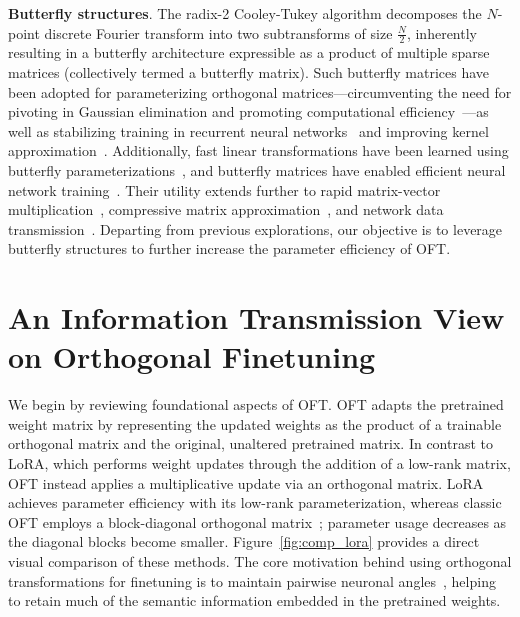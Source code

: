 \textbf{Butterfly structures}. The radix-2 Cooley-Tukey algorithm decomposes the $N$-point discrete Fourier transform into two subtransforms of size $\frac{N}{2}$, inherently resulting in a butterfly architecture expressible as a product of multiple sparse matrices (collectively termed a butterfly matrix). Such butterfly matrices have been adopted for parameterizing orthogonal matrices—circumventing the need for pivoting in Gaussian elimination and promoting computational efficiency~\cite{parker1995random}—as well as stabilizing training in recurrent neural networks~\cite{jing2017tunable} and improving kernel approximation~\cite{munkhoeva2018quadrature}. Additionally, fast linear transformations have been learned using butterfly parameterizations~\cite{dao2019learning,dao2019kaleidoscope}, and butterfly matrices have enabled efficient neural network training~\cite{chen2022pixelated,dao2022monarch}. Their utility extends further to rapid matrix-vector multiplication~\cite{michielssen1996multilevel,o2010algorithm}, compressive matrix approximation~\cite{li2015butterfly}, and network data transmission~\cite{klasing1994broadcasting,li2003linear,rajasingh2016transmission}. Departing from previous explorations, our objective is to leverage butterfly structures to further increase the parameter efficiency of OFT.

\section{An Information Transmission View on Orthogonal Finetuning}

We begin by reviewing foundational aspects of OFT. OFT adapts the pretrained weight matrix by representing the updated weights as the product of a trainable orthogonal matrix and the original, unaltered pretrained matrix. In contrast to LoRA, which performs weight updates through the addition of a low-rank matrix, OFT instead applies a multiplicative update via an orthogonal matrix. LoRA achieves parameter efficiency with its low-rank parameterization, whereas classic OFT employs a block-diagonal orthogonal matrix~\cite{qiu2023controlling}; parameter usage decreases as the diagonal blocks become smaller. Figure~\ref{fig:comp_lora} provides a direct visual comparison of these methods. The core motivation behind using orthogonal transformations for finetuning is to maintain pairwise neuronal angles~\cite{liu2018learning,liu2021orthogonal,qiu2023controlling}, helping to retain much of the semantic information embedded in the pretrained weights.

